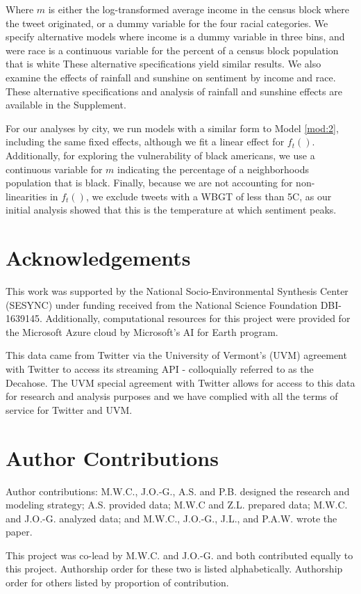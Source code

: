 \documentclass[fleqn,10pt]{wlscirep}
\begin{document}
Where $m$ is either the log-transformed average income in the census block where the tweet originated, or a dummy variable for the four racial categories.  We specify alternative models where income is a dummy variable in three bins, and were race is a continuous variable for the percent of a census block population that is white These alternative specifications yield similar results.  We also examine the effects of rainfall and sunshine on sentiment by income and race.  These alternative specifications and analysis of rainfall and sunshine effects are available in the Supplement.

For our analyses by city, we run models with a similar form to Model \ref{mod:2}, including the same fixed effects, although we fit a linear effect for $f_t()$.  Additionally, for exploring the vulnerability of black americans, we use a continuous variable for $m$ indicating the percentage of a neighborhoods population that is black.  Finally, because we are not accounting for non-linearities in $f_t()$, we exclude tweets with a WBGT of less than 5\textdegree C, as our initial analysis showed that this is the temperature at which sentiment peaks.

\section*{Acknowledgements}
This work was supported by the National Socio-Environmental Synthesis Center (SESYNC) under funding received from the National Science Foundation DBI-1639145.  Additionally, computational resources for this project were provided for the Microsoft Azure cloud by Microsoft's AI for Earth program.

This data came from Twitter via the University of Vermont’s (UVM) agreement with Twitter to access its streaming API - colloquially referred to as the Decahose.  The UVM special agreement with Twitter allows for access to this data for research and analysis purposes and we have complied with all the terms of service for Twitter and UVM. 



\section*{Author Contributions}
Author contributions: M.W.C., J.O.-G., A.S. and P.B. designed the research and modeling strategy; A.S. provided data; M.W.C and Z.L. prepared data; M.W.C. and J.O.-G. analyzed data; and M.W.C., J.O.-G., J.L., and P.A.W. wrote the paper.

\noindent This project was co-lead by M.W.C. and J.O.-G. and both contributed equally to this project. Authorship order for these two is listed alphabetically. Authorship order for others listed by proportion of contribution.
\end{document}
